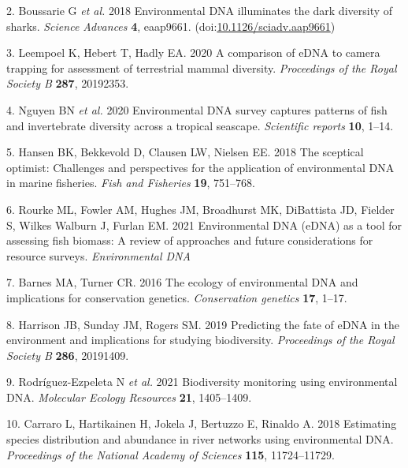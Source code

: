 \documentclass[
]{article}
\begin{document}
\leavevmode\hypertarget{ref-Boussarie2018sharks}{}%
2. Boussarie G \emph{et al.} 2018 Environmental DNA illuminates the dark
diversity of sharks. \emph{Science Advances} \textbf{4}, eaap9661.
(doi:\href{https://doi.org/10.1126/sciadv.aap9661}{10.1126/sciadv.aap9661})

\leavevmode\hypertarget{ref-leempoel2020comparison}{}%
3. Leempoel K, Hebert T, Hadly EA. 2020 A comparison of eDNA to camera
trapping for assessment of terrestrial mammal diversity.
\emph{Proceedings of the Royal Society B} \textbf{287}, 20192353.

\leavevmode\hypertarget{ref-nguyen2020environmental}{}%
4. Nguyen BN \emph{et al.} 2020 Environmental DNA survey captures
patterns of fish and invertebrate diversity across a tropical seascape.
\emph{Scientific reports} \textbf{10}, 1--14.

\leavevmode\hypertarget{ref-hansen2018sceptical}{}%
5. Hansen BK, Bekkevold D, Clausen LW, Nielsen EE. 2018 The sceptical
optimist: Challenges and perspectives for the application of
environmental DNA in marine fisheries. \emph{Fish and Fisheries}
\textbf{19}, 751--768.

\leavevmode\hypertarget{ref-rourke2021environmental}{}%
6. Rourke ML, Fowler AM, Hughes JM, Broadhurst MK, DiBattista JD,
Fielder S, Wilkes Walburn J, Furlan EM. 2021 Environmental DNA (eDNA) as
a tool for assessing fish biomass: A review of approaches and future
considerations for resource surveys. \emph{Environmental DNA}

\leavevmode\hypertarget{ref-barnes2016ecology}{}%
7. Barnes MA, Turner CR. 2016 The ecology of environmental DNA and
implications for conservation genetics. \emph{Conservation genetics}
\textbf{17}, 1--17.

\leavevmode\hypertarget{ref-harrison2019predicting}{}%
8. Harrison JB, Sunday JM, Rogers SM. 2019 Predicting the fate of eDNA
in the environment and implications for studying biodiversity.
\emph{Proceedings of the Royal Society B} \textbf{286}, 20191409.

\leavevmode\hypertarget{ref-rodriguez2021biodiversity}{}%
9. Rodr\'{i}guez-Ezpeleta N \emph{et al.} 2021 Biodiversity monitoring using
environmental DNA. \emph{Molecular Ecology Resources} \textbf{21},
1405--1409.

\leavevmode\hypertarget{ref-carraro2018estimating}{}%
10. Carraro L, Hartikainen H, Jokela J, Bertuzzo E, Rinaldo A. 2018
Estimating species distribution and abundance in river networks using
environmental DNA. \emph{Proceedings of the National Academy of
Sciences} \textbf{115}, 11724--11729.
\end{document}

